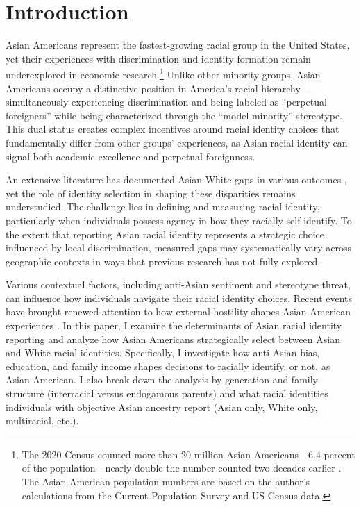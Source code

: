
\section{Introduction}\label{sec:intro}

Asian Americans represent the fastest-growing racial group in the United States, yet their experiences with discrimination and identity formation remain underexplored in economic research.\footnote{The 2020 Census counted more than 20 million Asian Americans---6.4 percent of the population---nearly double the number counted two decades earlier \autocite{floodsarahIntegratedPublicUse2021a}. The Asian American population numbers are based on the author's calculations from the Current Population Survey and US Census data.} Unlike other minority groups, Asian Americans occupy a distinctive position in America's racial hierarchy—simultaneously experiencing discrimination and being labeled as ``perpetual foreigners'' while being characterized through the ``model minority'' stereotype. This dual status creates complex incentives around racial identity choices that fundamentally differ from other groups' experiences, as Asian racial identity can signal both academic excellence and perpetual foreignness.

An extensive literature has documented Asian-White gaps in various outcomes \autocite{chiswick1983analysis, duleep2012economic, hilger2016upward, arabsheibani2010asian}, yet the role of identity selection in shaping these disparities remains understudied. The challenge lies in defining and measuring racial identity, particularly when individuals possess agency in how they racially self-identify. To the extent that reporting Asian racial identity represents a strategic choice influenced by local discrimination, measured gaps may systematically vary across geographic contexts in ways that previous research has not fully explored.

Various contextual factors, including anti-Asian sentiment and stereotype threat, can influence how individuals navigate their racial identity choices. Recent events have brought renewed attention to how external hostility shapes Asian American experiences \autocite{gover2020anti}. In this paper, I examine the determinants of Asian racial identity reporting and analyze how Asian Americans strategically select between Asian and White racial identities. Specifically, I investigate how anti-Asian bias, education, and family income shapes decisions to racially identify, or not, as Asian American. I also break down the analysis by generation and family structure (interracial versus endogamous parents) and what racial identities individuals with objective Asian ancestry report (Asian only, White only, multiracial, etc.).

